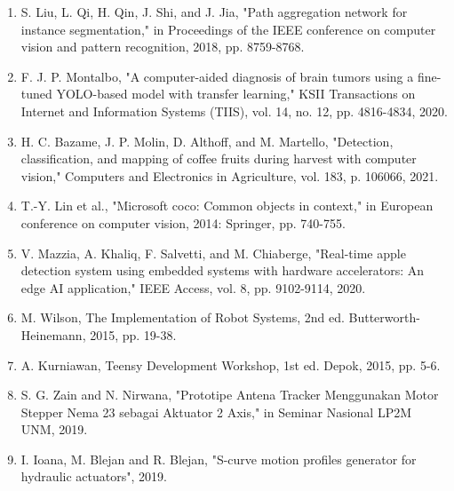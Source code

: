 \documentclass[10pt, letterpaper]{article}
\begin{document}
\begin{enumerate}
        \item S. Liu, L. Qi, H. Qin, J. Shi, and J. Jia, "Path aggregation network for instance segmentation," in Proceedings of the IEEE conference on computer vision and pattern recognition, 2018, pp. 8759-8768. 
        \item F. J. P. Montalbo, "A computer-aided diagnosis of brain tumors using a fine-tuned YOLO-based model with transfer learning," KSII Transactions on Internet and Information Systems (TIIS), vol. 14, no. 12, pp. 4816-4834, 2020.
        \item H. C. Bazame, J. P. Molin, D. Althoff, and M. Martello, "Detection, classification, and mapping of coffee fruits during harvest with computer vision," Computers and Electronics in Agriculture, vol. 183, p. 106066, 2021.
        \item T.-Y. Lin et al., "Microsoft coco: Common objects in context," in European conference on computer vision, 2014: Springer, pp. 740-755. 
        \item V. Mazzia, A. Khaliq, F. Salvetti, and M. Chiaberge, "Real-time apple detection system using embedded systems with hardware accelerators: An edge AI application," IEEE Access, vol. 8, pp. 9102-9114, 2020.
        \item M. Wilson, The Implementation of Robot Systems, 2nd ed. Butterworth-Heinemann, 2015, pp. 19-38.
        \item A. Kurniawan, Teensy Development Workshop, 1st ed. Depok, 2015, pp. 5-6.
        \item S. G. Zain and N. Nirwana, "Prototipe Antena Tracker Menggunakan Motor Stepper Nema 23 sebagai Aktuator 2 Axis," in Seminar Nasional LP2M UNM, 2019. 
        \item I. Ioana, M. Blejan and R. Blejan, "S-curve motion profiles generator for hydraulic actuators", 2019. 
    \end{enumerate}
\end{document}
